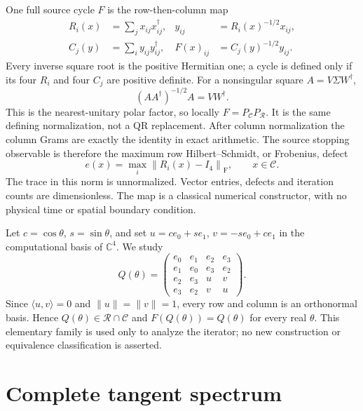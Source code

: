 \documentclass[11pt,a4paper]{article}
\newcommand{\C}{\mathbb C}
\newcommand{\Id}{I_4}
\newcommand{\adj}{^{\dagger}}
\newcommand{\fro}[1]{\left\|#1\right\|_{\mathrm F}}
\begin{document}
One full source cycle $F$ is the row-then-column map
\begin{equation}
\begin{aligned}
 R_i(x)&=\sum_jx_{ij}x_{ij}\adj,
 &y_{ij}&=R_i(x)^{-1/2}x_{ij},\\
 C_j(y)&=\sum_i y_{ij}y_{ij}\adj,
 &F(x)_{ij}&=C_j(y)^{-1/2}y_{ij}.
\end{aligned}
 \label{eq:cycle}
\end{equation}
Every inverse square root is the positive Hermitian one; a cycle is defined only if its four $R_i$ and four $C_j$ are positive definite. For a nonsingular square $A=V\Sigma W\adj$,
\begin{equation}
 (AA\adj)^{-1/2}A=VW\adj.
 \label{eq:polar}
\end{equation}
This is the nearest-unitary polar factor, so locally $F=P_{\mathcal C}P_{\mathcal R}$. It is the same defining normalization, not a QR replacement. After column normalization the column Grams are exactly the identity in exact arithmetic. The source stopping observable is therefore the maximum row Hilbert--Schmidt, or Frobenius, defect
\begin{equation}
 e(x)=\max_i\fro{R_i(x)-\Id},\qquad x\in\mathcal C.
 \label{eq:residual}
\end{equation}
The trace in this norm is unnormalized. Vector entries, defects and iteration counts are dimensionless. The map is a classical numerical constructor, with no physical time or spatial boundary condition.

Let $c=\cos\theta$, $s=\sin\theta$, and set $u=c e_0+s e_1$, $v=-s e_0+c e_1$ in the computational basis of $\C^4$. We study
\begin{equation}
 Q(\theta)=
 \begin{pmatrix}
 e_0&e_1&e_2&e_3\\
 e_1&e_0&e_3&e_2\\
 e_2&e_3&u&v\\
 e_3&e_2&v&u
 \end{pmatrix}.
 \label{eq:family}
\end{equation}
Since $\langle u,v\rangle=0$ and $\|u\|=\|v\|=1$, every row and column is an orthonormal basis. Hence $Q(\theta)\in\mathcal R\cap\mathcal C$ and $F(Q(\theta))=Q(\theta)$ for every real $\theta$. This elementary family is used only to analyze the iterator; no new construction or equivalence classification is asserted.

\section{Complete tangent spectrum}
\label{sec:spectrum}
\end{document}
